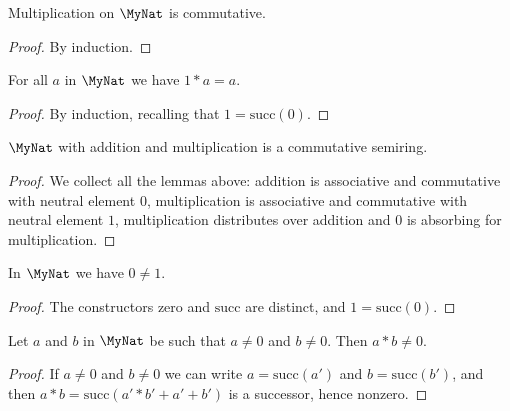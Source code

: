 \begin{lemma}
    \label{MyNat.mul_comm}
    \leanok
    Multiplication on $\MyNat$ is commutative.
\end{lemma}
\begin{proof}
    \leanok
    By induction.
\end{proof}

\begin{lemma}
    \label{MyNat.one_mul}
    \leanok
    For all $a$ in $\MyNat$ we have $1 * a = a$.
\end{lemma}
\begin{proof}
    \leanok
    By induction, recalling that $1 = \mathrm{succ}(0)$.
\end{proof}

\begin{proposition}
    \label{MyNat.instCommSemiring}
    \leanok
    $\MyNat$ with addition and multiplication is a commutative semiring.
\end{proposition}
\begin{proof}
    \leanok
    We collect all the lemmas above: addition is associative and commutative with neutral element
    $0$, multiplication is associative and commutative with neutral element $1$, multiplication
    distributes over addition and $0$ is absorbing for multiplication.
\end{proof}

\begin{lemma}
    \label{MyNat.zero_ne_one}
    \leanok
    In $\MyNat$ we have $0 \neq 1$.
\end{lemma}
\begin{proof}
    \leanok
    The constructors $\mathrm{zero}$ and $\mathrm{succ}$ are distinct, and $1 = \mathrm{succ}(0)$.
\end{proof}

\begin{lemma}
    \label{MyNat.mul_ne_zero}
    \leanok
    Let $a$ and $b$ in $\MyNat$ be such that $a \neq 0$ and $b \neq 0$. Then $a * b \neq 0$.
\end{lemma}
\begin{proof}
    \leanok
    If $a \neq 0$ and $b \neq 0$ we can write $a = \mathrm{succ}(a')$ and $b = \mathrm{succ}(b')$, and
    then $a * b = \mathrm{succ}(a' * b' + a' + b')$ is a successor, hence nonzero.
\end{proof}


